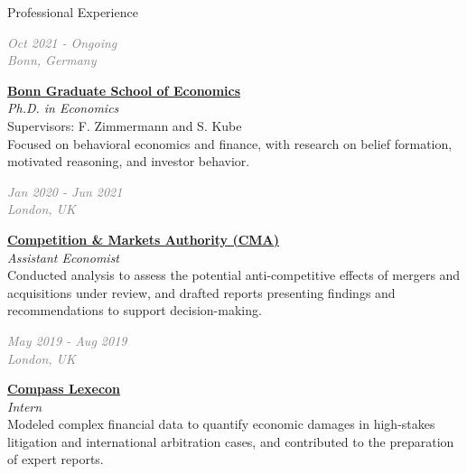 \documentclass{resume} %
\newcommand{\cventry}[2]{%
  \noindent
  \begin{minipage}[t]{0.24\linewidth}
    \raggedright\textcolor{gray}{\emph{#1}}
  \end{minipage}%
  \hspace{0.02\linewidth}%
  \begin{minipage}[t]{0.73\linewidth}
    \raggedright #2
  \end{minipage}
  \par\medskip
}
\newcommand{\cvtitle}[1]{\textbf{#1}}
\newcommand{\cvrole}[1]{\emph{#1}}
\newcommand{\cvdesc}[1]{{\small\color{gray}#1}}
\begin{document}

\begin{rSection}{Professional Experience}

    
\cventry{Oct 2021 - Ongoing \\ Bonn, Germany}%
        {\cvtitle{\href{https://www.econ.uni-bonn.de/bgse/en}{Bonn Graduate School of Economics}} \\
        {\cvrole{Ph.D. in Economics}} \\[2pt]
        {\cvdesc{Supervisors: F. Zimmermann and S. Kube\\
        Focused on behavioral economics and finance, with research on belief formation, motivated reasoning, and investor behavior.}}}

\cventry{Jan 2020 - Jun 2021 \\ London, UK}%
        {\cvtitle{\href{https://www.gov.uk/government/organisations/competition-and-markets-authority}{Competition \& Markets Authority (CMA)}} \\
        {\cvrole{Assistant Economist}} \\[2pt]
        {\cvdesc{Conducted analysis to assess the potential anti-competitive effects of mergers and acquisitions under review, and drafted reports presenting findings and recommendations to support decision-making.}}}

\cventry{May 2019 - Aug 2019 \\ London, UK}%
        {\cvtitle{\href{https://www.compasslexecon.com}{Compass Lexecon}} \\
        {\cvrole{Intern}} \\[2pt]
        {\cvdesc{Modeled complex financial data to quantify economic damages in high-stakes litigation and international arbitration cases, and contributed to the preparation of expert reports.}}}
       
\end{rSection}

\end{document}
